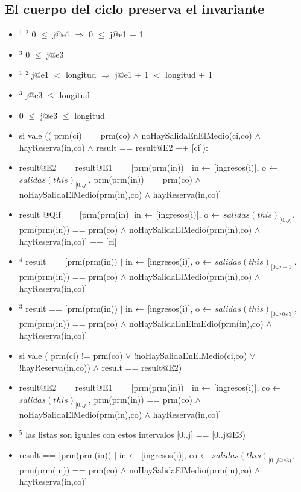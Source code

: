 \subsection{El cuerpo del ciclo preserva el invariante}
\begin{itemize}
	\item $ ^1 $ $ ^2 $ 0 $ \leq $ j@e1 $ \Rightarrow $ 0 $ \leq $ j@e1 + 1
	\item $ ^3 $ 0 $ \leq $ j@e3
	\item $ ^1 $ $^2 $ j@e1 $ < $ longitud $ \Rightarrow $ j@e1 + 1 $ < $ longitud + 1
	\item $ ^3 $ j@e3 $ \leq $ longitud	
	\item \textcolor{NavyBlue}{0 $ \leq $ j@e3 $ \leq $ longitud} \checkmark
	\item si vale (( prm(ci) == prm(co) $\land$ noHaySalidaEnElMedio(ci,co) $\land$ hayReserva(in,co) $\land$ result == result@E2 ++ [ci]):
	\item result@E2 == result@E1 == [prm(prm(in)) $|$ in $\leftarrow$ [ingresos(i)], o $\leftarrow$ $salidas(this)_{[0..j)}$, prm(prm(in)) == prm(co) $\land$ noHaySalidaElMedio(prm(in),co) $\land$ hayReserva(in,co)]
	\item result @Qif == [prm(prm(in)$|$ in $\leftarrow$ [ingresos(i)], o $\leftarrow$ $salidas(this)_{[0..j)}$, prm(prm(in)) == prm(co) $\land$ noHaySalidaElMedio(prm(in),co) $\land$ hayReserva(in,co)] ++ [ci]
	\item $ ^4 $ result == [prm(prm(in)) $|$ in $\leftarrow$ [ingresos(i)], o $\leftarrow$ $salidas(this)_{[0..j+1)}$, prm(prm(in)) == prm(co) $\land$ noHaySalidaElMedio(prm(in),co) $\land$ hayReserva(in,co)]
	\item $ ^3 $ \textcolor{NavyBlue}{result == [prm(prm(in)) $|$ in $\leftarrow$ [ingresos(i)], o $\leftarrow$ $salidas(this)_{[0..j@e3)}$, prm(prm(in)) == prm(co) $\land$ noHaySalidaEnElmEdio(prm(in),co) $\land$ hayReserva(in,co)]} \checkmark
	\item si vale ( prm(ci) != prm(co) $ \lor $ !noHaySalidaEnElMedio(ci,co) $ \lor $ !hayReserva(in,co)) $ \land $ result == result@E2)
	\item result@E2 == result@E1 == [prm(prm(in)) $|$ in $\leftarrow$ [ingresos(i)], co $\leftarrow$ $salidas(this)_{[0..j)}$, prm(prm(in)) == prm(co) $\land$ noHaySalidaElMedio(prm(in),co) $\land$ hayReserva(in,co)]
	\item $ ^5 $ las listas son iguales con estos intervalos [0..j] == [0..j@E3)
	\item \textcolor{NavyBlue}{result == [prm(prm(in)) $|$ in $\leftarrow$ [ingresos(i)], co $\leftarrow$ $salidas(this)_{[0..j@e3)}$, prm(prm(in)) == prm(co) $\land$ noHaySalidaElMedio(prm(in),co) $\land$ hayReserva(in,co)]} \checkmark
	
\end{itemize}

